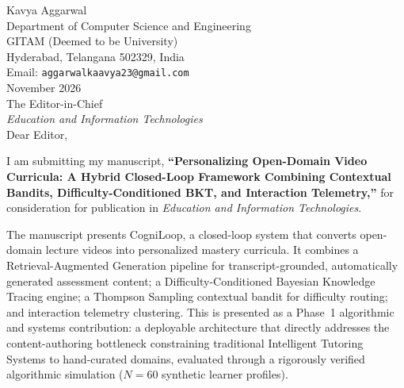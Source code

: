 \documentclass[11pt]{article}
\begin{document}
\thispagestyle{empty}

\noindent
Kavya Aggarwal \\
Department of Computer Science and Engineering \\
GITAM (Deemed to be University) \\
Hyderabad, Telangana 502329, India \\
Email: \texttt{aggarwalkaavya23@gmail.com} \\[1.5em]

\noindent
November 2026 \\[1.5em]

\noindent
The Editor-in-Chief \\
\textit{Education and Information Technologies} \\[1.5em]

\noindent
Dear Editor,

\vspace{0.6em}
\noindent
I am submitting my manuscript, \textbf{``Personalizing Open-Domain Video Curricula: A Hybrid Closed-Loop Framework Combining Contextual Bandits, Difficulty-Conditioned BKT, and Interaction Telemetry,''} for consideration for publication in \textit{Education and Information Technologies}.

\vspace{0.6em}
\noindent
The manuscript presents CogniLoop, a closed-loop system that converts open-domain lecture videos into personalized mastery curricula. It combines a Retrieval-Augmented Generation pipeline for transcript-grounded, automatically generated assessment content; a Difficulty-Conditioned Bayesian Knowledge Tracing engine; a Thompson Sampling contextual bandit for difficulty routing; and interaction telemetry clustering. This is presented as a Phase~1 algorithmic and systems contribution: a deployable architecture that directly addresses the content-authoring bottleneck constraining traditional Intelligent Tutoring Systems to hand-curated domains, evaluated through a rigorously verified algorithmic simulation ($N=60$ synthetic learner profiles).
\end{document}
